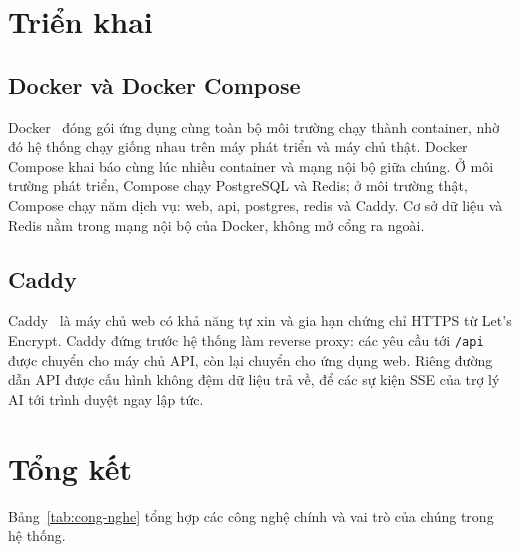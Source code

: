 \section{Triển khai}

\subsection{Docker và Docker Compose}

Docker~\cite{docker} đóng gói ứng dụng cùng toàn bộ môi trường chạy thành container, nhờ đó hệ thống chạy giống nhau trên máy phát triển và máy chủ thật. Docker Compose khai báo cùng lúc nhiều container và mạng nội bộ giữa chúng. Ở môi trường phát triển, Compose chạy PostgreSQL và Redis; ở môi trường thật, Compose chạy năm dịch vụ: web, api, postgres, redis và Caddy. Cơ sở dữ liệu và Redis nằm trong mạng nội bộ của Docker, không mở cổng ra ngoài.

\subsection{Caddy}

Caddy~\cite{caddy} là máy chủ web có khả năng tự xin và gia hạn chứng chỉ HTTPS từ Let's Encrypt. Caddy đứng trước hệ thống làm reverse proxy: các yêu cầu tới \texttt{/api} được chuyển cho máy chủ API, còn lại chuyển cho ứng dụng web. Riêng đường dẫn API được cấu hình không đệm dữ liệu trả về, để các sự kiện SSE của trợ lý AI tới trình duyệt ngay lập tức.

\section{Tổng kết}

Bảng~\ref{tab:cong-nghe} tổng hợp các công nghệ chính và vai trò của chúng trong hệ thống.

